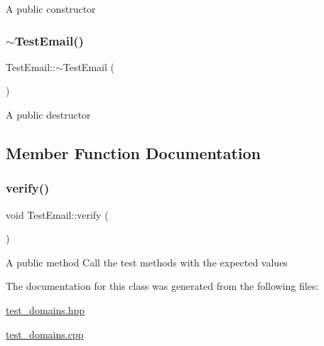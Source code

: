 A public constructor \mbox{\label{class_test_email_ad1019728841de85fb998a46aa974d9e6}} 
\subsubsection{\texorpdfstring{$\sim$\+Test\+Email()}{~TestEmail()}}
{\footnotesize\ttfamily Test\+Email\+::$\sim$\+Test\+Email (\begin{DoxyParamCaption}{ }\end{DoxyParamCaption})}

A public destructor 

\subsection{Member Function Documentation}
\mbox{\label{class_test_email_a55b1f52af1f5b8672c9668652384578f}} 
\subsubsection{\texorpdfstring{verify()}{verify()}}
{\footnotesize\ttfamily void Test\+Email\+::verify (\begin{DoxyParamCaption}{ }\end{DoxyParamCaption})}

A public method Call the test methods with the expected values 

The documentation for this class was generated from the following files\+:\begin{DoxyCompactItemize}
\item 
\hyperlink{test__domains_8hpp}{test\+\_\+domains.\+hpp}\item 
\hyperlink{test__domains_8cpp}{test\+\_\+domains.\+cpp}\end{DoxyCompactItemize}
